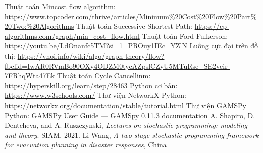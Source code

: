 \documentclass[a4paper]{article}
\begin{document}
\newpage
\begin{thebibliography}{2}
Thuật toán Mincost flow algorithm: \url{https://www.topcoder.com/thrive/articles/Minimum%20Cost%20Flow%20Part%20Two:%20Algorithms}
Thuật toán Successive Shortest Path: \url{https://cp-algorithms.com/graph/min_cost_flow.html}
Thuật toán Ford Fulkerson: \url{https://youtu.be/LdOnanfc5TM?si=1_PROuy1IEc_YZlN }
Luồng cực đại trên đồ thị: \url{https://vnoi.info/wiki/algo/graph-theory/flow?fbclid=IwAR0RVmBo90OXy4ODZM0tycAZpslCZyU5MTuRse_SE2veir-7FRhqWta47Ek}
Thuật toán Cycle Cancellinm: \url{https://hyperskill.org/learn/step/28463}
Python cơ bản: \url{https://www.w3schools.com/}
Thư viện NetworkX Python: \url{https://networkx.org/documentation/stable/tutorial.html 
Thư viện GAMSPy Python: GAMSPy User Guide — GAMSpy 0.11.3 documentation}
A. Shapiro, D. Dentcheva, and A. Ruszczynski, \emph{Lectures on stochastic programming: modeling
and theory}. SIAM, 2021.
Li Wang, \emph{A two-stage stochastic programming framework for evacuation planning in
disaster responses},  China

\end{thebibliography}
\end{document}
